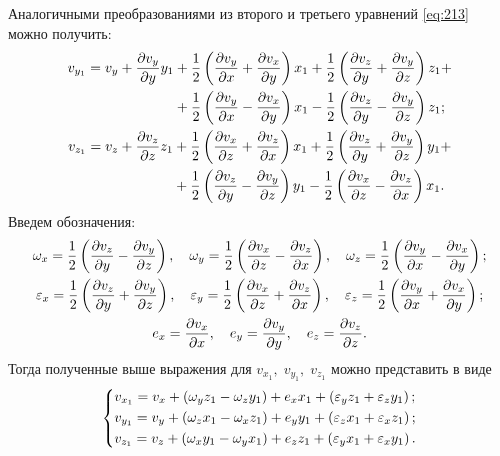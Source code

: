 	Аналогичными преобразованиями из второго и третьего уравнений \eqref{eq:213} можно получить:
	\begin{gather*}
		\begin{aligned}
			v_{y_1} = v_y + \frac{\partial v_y}{\partial y}y_1 &+ \frac{1}{2}\left(\frac{\partial v_y}{\partial x} + \frac{\partial v_x}{\partial y}\right)x_1 + \frac{1}{2}\left(\frac{\partial v_z}{\partial y} + \frac{\partial v_y}{\partial z}\right)z_1 +\\&+ \frac{1}{2}\left(\frac{\partial v_y}{\partial x} - \frac{\partial v_x}{\partial y}\right)x_1 - \frac{1}{2}\left(\frac{\partial v_z}{\partial y} - \frac{\partial v_y}{\partial z}\right)z_1;
		\end{aligned}\\
		\begin{aligned}
			v_{z_1} = v_z + \frac{\partial v_z}{\partial z}z_1 &+ \frac{1}{2}\left(\frac{\partial v_x}{\partial z} + \frac{\partial v_z}{\partial x}\right)x_1 + \frac{1}{2}\left(\frac{\partial v_z}{\partial y} + \frac{\partial v_y}{\partial z}\right)y_1 +\\&+ \frac{1}{2}\left(\frac{\partial v_z}{\partial y} - \frac{\partial v_y}{\partial z}\right)y_1 - \frac{1}{2}\left(\frac{\partial v_x}{\partial z} - \frac{\partial v_z}{\partial x}\right)x_1.
		\end{aligned}
	\end{gather*}\n
	Введем обозначения:
	\begin{gather}
		\omega_x = \frac{1}{2}\left(\frac{\partial v_z}{\partial y} - \frac{\partial v_y}{\partial z}\right), \quad \omega_y = \frac{1}{2}\left(\frac{\partial v_x}{\partial z} - \frac{\partial v_z}{\partial x}\right), \quad \omega_z = \frac{1}{2}\left(\frac{\partial v_y}{\partial x} - \frac{\partial v_x}{\partial y}\right);\label{eq:214}\\
		\varepsilon_x = \frac{1}{2}\left(\frac{\partial v_z}{\partial y} + \frac{\partial v_y}{\partial z}\right), \quad \varepsilon_y = \frac{1}{2}\left(\frac{\partial v_x}{\partial z} + \frac{\partial v_z}{\partial x}\right), \quad \varepsilon_z = \frac{1}{2}\left(\frac{\partial v_y}{\partial x} + \frac{\partial v_x}{\partial y}\right);\\
		e_x = \frac{\partial v_x}{\partial x}, \quad e_y = \frac{\partial v_y}{\partial y}, \quad e_z = \frac{\partial v_z}{\partial z}.
	\end{gather}\n
	Тогда полученные выше выражения для $v_{x_1},\; v_{y_1},\; v_{z_1}$ можно представить в виде
	\begin{gather}
		\begin{dcases}
			v_{x_1} = v_x + \left(\omega_y z_1 - \omega_z y_1\right) + e_x x_1 + \left(\varepsilon_y z_1 + \varepsilon_z y_1\right);\\
			v_{y_1} = v_y + \left(\omega_z x_1 - \omega_x z_1\right) + e_y y_1 + \left(\varepsilon_z x_1 + \varepsilon_x z_1\right);\\
			v_{z_1} = v_z + \left(\omega_x y_1 - \omega_y x_1\right) + e_z z_1 + \left(\varepsilon_y x_1 + \varepsilon_x y_1\right).
		\end{dcases}
	\end{gather}\n
